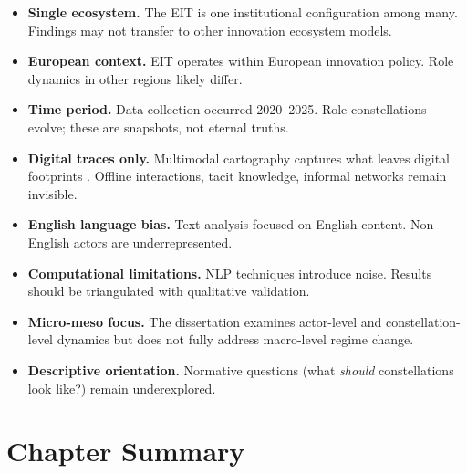 \documentclass[../main.tex]{subfiles}
\begin{document}
\begin{itemize}[leftmargin=*, itemsep=0.3em]
\item \textbf{Single ecosystem.} The EIT is one institutional configuration among many. Findings may not transfer to other innovation ecosystem models.
\item \textbf{European context.} EIT operates within European innovation policy. Role dynamics in other regions likely differ.
\item \textbf{Time period.} Data collection occurred 2020--2025. Role constellations evolve; these are snapshots, not eternal truths.
\item \textbf{Digital traces only.} Multimodal cartography captures what leaves digital footprints \cite{ruths2014social,boyd2012critical}. Offline interactions, tacit knowledge, informal networks remain invisible.
\item \textbf{English language bias.} Text analysis focused on English content. Non-English actors are underrepresented.
\item \textbf{Computational limitations.} NLP techniques introduce noise. Results should be triangulated with qualitative validation.
\item \textbf{Micro-meso focus.} The dissertation examines actor-level and constellation-level dynamics but does not fully address macro-level regime change.
\item \textbf{Descriptive orientation.} Normative questions (what \textit{should} constellations look like?) remain underexplored.
\end{itemize}

\section{Chapter Summary}
\end{document}
